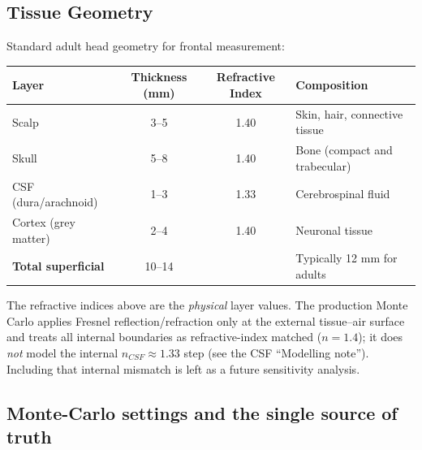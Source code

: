 \documentclass[12pt]{article}
\def\text#1{#1}%
\begin{document}
\subsection{Tissue Geometry}

Standard adult head geometry for frontal measurement:

\begin{center}
\small
\begin{tabular}{l c c >{\raggedright\arraybackslash}p{4.2cm}}
\hline
\textbf{Layer} & \textbf{Thickness (mm)} & \textbf{Refractive Index} & \textbf{Composition} \\
\hline
Scalp & 3--5 & 1.40 & Skin, hair, connective tissue \\
Skull & 5--8 & 1.40 & Bone (compact and trabecular) \\
CSF (dura/arachnoid) & 1--3 & 1.33 & Cerebrospinal fluid \\
Cortex (grey matter) & 2--4 & 1.40 & Neuronal tissue \\
\hline
\textbf{Total superficial} & 10--14 & & Typically 12 mm for adults \\
\hline
\end{tabular}
\end{center}

\noindent The refractive indices above are the \emph{physical} layer values. The production Monte Carlo applies Fresnel reflection/refraction only at the external tissue--air surface and treats all internal boundaries as refractive-index matched ($n=1.4$); it does \emph{not} model the internal $n_{\text{CSF}}\approx1.33$ step (see the CSF ``Modelling note''). Including that internal mismatch is left as a future sensitivity analysis.

\subsection{Monte-Carlo settings and the single source of truth}
\end{document}
